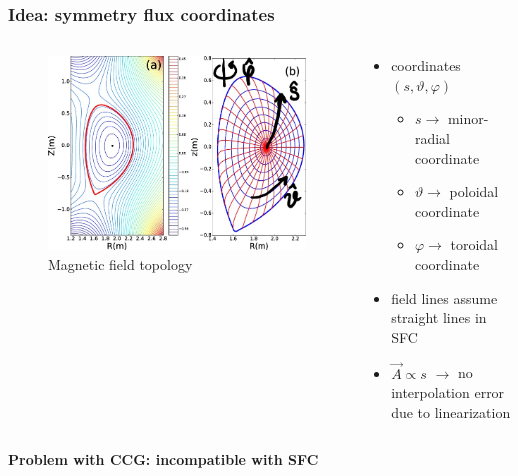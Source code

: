 \documentclass{beamer}
\begin{document}
\begin{frame}
\frametitle{Idea: symmetry flux coordinates}
\vspace{-1 cm}
\begin{columns}[onlytextwidth]
	\begin{column}{0.5\textwidth}
		\begin{center}
			\begin{figure}
				\includegraphics[trim={0 0cm 0 0cm},clip,width=1\textwidth]{FIGURES/magnetic_field_labeled0.jpg}
				\caption{Magnetic field topology}
			\end{figure}
		\end{center}
	\end{column}
	\begin{column}{0.5\textwidth}
		\vspace{0 cm}
		\begin{center}
			\begin{itemize}
				\item coordinates $(s,\vartheta,\varphi)$\\
				\begin{itemize}
					\item $s\rightarrow$ minor-radial coordinate
					\item $\vartheta \rightarrow$ poloidal coordinate
					\item $\varphi \rightarrow$ toroidal coordinate
				\end{itemize}
				\item field lines assume straight lines in SFC
				\item $\vec{A}\propto s$
				$\rightarrow$ no interpolation error due to linearization
			\end{itemize}
		\end{center}
	\end{column}
\end{columns}
\vspace{0.4 cm}
\textbf{Problem with CCG: incompatible with SFC}
\end{frame}
\end{document}
